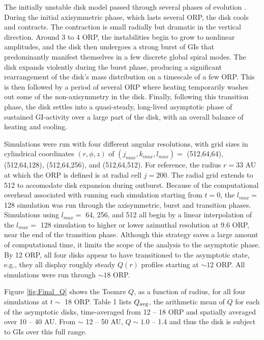 \documentclass[manuscript]{aastex}
\begin{document}
The initially unstable disk model passed through several phases of evolution \citep[see also][]{pickett2003, mejia2005}.  
During the initial axisymmetric phase, 
which lasts several ORP, the disk cools and contracts.  The contraction is small radially but dramatic in the vertical direction. Around 3 to 4 ORP, the instabilities begin to grow to nonlinear amplitudes, and the disk 
then undergoes a strong burst of GIs that predominantly manifest themselves in a few discrete global spiral modes.  The disk expands violently during the burst phase, producing a significant rearrangement of the disk's mass distribution on a timescale of a few ORP. This is then followed by a period of several ORP where heating temporarily washes out some of the non-axisymmetry in the disk.  Finally, following this transition phase, the disk settles into a quasi-steady, long-lived asymptotic 
phase of sustained GI-activity over a large part of the disk, with an overall balance of heating and cooling.

Simulations were run with four different angular resolutions, with grid sizes in cylindrical coordinates $(r,\phi,z)$ of  $(j_{max}, k_{max}, l_{max}) =$ (512,64,64), (512,64,128), (512,64,256), and (512,64,512). 
For reference, the radius $r = 33$ AU at which the ORP is defined is at radial cell $j = 200$.  The radial grid extends to 512
to accomodate disk expansion during outburst.
Because of the computational overhead associated with running each simulation starting from $t = 0$, the $l_{max} =$ 128 simulation was run through the axisymmetric, burst and transition phases. Simulations using $l_{max} =$ 64, 256, and 512 all begin by a linear interpolation of the $l_{max} =$ 128 simulation to higher or lower azimuthal resolution at 9.6 ORP, near the end of the transition
phase. Although this strategy saves a large amount of computational time, it limits the scope of the analysis to the asymptotic phase. By 12 ORP, all four disks appear to have transitioned to the asymptotic state,
e.g., they all display roughly steady $Q(r)$ profiles starting at $\sim 12$ ORP.  All simulations were 
run through $\sim 18$ ORP.

Figure \ref{fig:Final_Q} shows the Toomre $Q$, as a function of radius, for all four simulations at $t \sim$ 18 ORP.  
Table 1 lists $Q_{\rm avg}$, the arithmetic mean of $Q$ for each of the asymptotic disks, time-averaged from 12 -- 18 ORP and spatially averaged over 10 -- 40 AU.  From $\sim$ 12 -- 50 AU, $Q \sim 1.0$ -- 1.4 and thus the disk is subject to GIs over this full range.  
\end{document}
